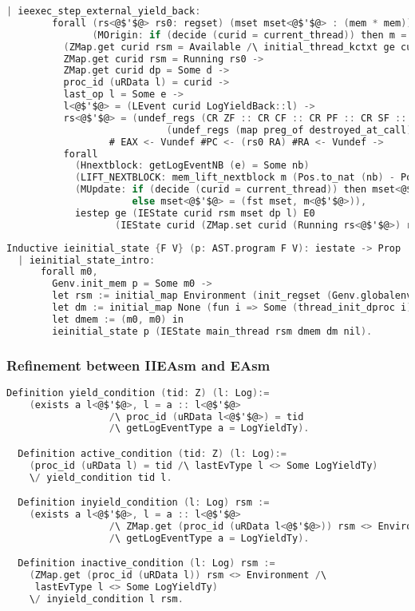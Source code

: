 \begin{lstlisting}[language=C]
    | ieexec_step_external_yield_back:
        forall (rs<@$'$@> rs0: regset) (mset mset<@$'$@> : (mem * mem)) (m m<@$'$@>: mem) curid rsm l l<@$'$@> nb dp d e
               (MOrigin: if (decide (curid = current_thread)) then m = fst mset else m = snd mset),
          (ZMap.get curid rsm = Available /\ initial_thread_kctxt ge curid l = Some rs0) \/
          ZMap.get curid rsm = Running rs0 ->
          ZMap.get curid dp = Some d ->
          proc_id (uRData l) = curid ->
          last_op l = Some e ->
          l<@$'$@> = (LEvent curid LogYieldBack::l) ->
          rs<@$'$@> = (undef_regs (CR ZF :: CR CF :: CR PF :: CR SF :: CR OF :: nil)
                            (undef_regs (map preg_of destroyed_at_call) rs0)) 
                  # EAX <- Vundef #PC <- (rs0 RA) #RA <- Vundef ->
          forall
            (Hnextblock: getLogEventNB (e) = Some nb)
            (LIFT_NEXTBLOCK: mem_lift_nextblock m (Pos.to_nat (nb) - Pos.to_nat (Mem.nextblock m) % nat) = m<@$'$@>)
            (MUpdate: if (decide (curid = current_thread)) then mset<@$'$@> = (m<@$'$@>, snd mset) 
                      else mset<@$'$@> = (fst mset, m<@$'$@>)),
            iestep ge (IEState curid rsm mset dp l) E0
                   (IEState curid (ZMap.set curid (Running rs<@$'$@>) rsm) mset<@$'$@> dp l<@$'$@>).

\end{lstlisting}

\begin{lstlisting}[language=C]
  Inductive ieinitial_state {F V} (p: AST.program F V): iestate -> Prop :=
  | ieinitial_state_intro: 
      forall m0,
        Genv.init_mem p = Some m0 ->
        let rsm := initial_map Environment (init_regset (Genv.globalenv p)) active_threads in
        let dm := initial_map None (fun i => Some (thread_init_dproc i)) active_threads in
        let dmem := (m0, m0) in
        ieinitial_state p (IEState main_thread rsm dmem dm nil).
\end{lstlisting}

\subsubsection{Refinement between IIEAsm and EAsm}
\begin{lstlisting}[language=C]
  Definition yield_condition (tid: Z) (l: Log):=
    (exists a l<@$'$@>, l = a :: l<@$'$@>
                  /\ proc_id (uRData l<@$'$@>) = tid
                  /\ getLogEventType a = LogYieldTy).

  Definition active_condition (tid: Z) (l: Log):=
    (proc_id (uRData l) = tid /\ lastEvType l <> Some LogYieldTy)
    \/ yield_condition tid l.

  Definition inyield_condition (l: Log) rsm :=
    (exists a l<@$'$@>, l = a :: l<@$'$@> 
                  /\ ZMap.get (proc_id (uRData l<@$'$@>)) rsm <> Environment
                  /\ getLogEventType a = LogYieldTy).

  Definition inactive_condition (l: Log) rsm :=
    (ZMap.get (proc_id (uRData l)) rsm <> Environment /\
     lastEvType l <> Some LogYieldTy)
    \/ inyield_condition l rsm.
\end{lstlisting}


